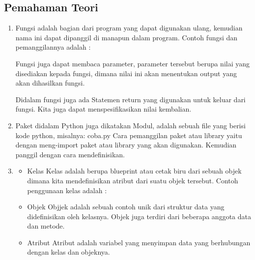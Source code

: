 \subsection{Pemahaman Teori}
\begin{enumerate}
	\item Fungsi adalah bagian dari program yang dapat digunakan ulang, kemudian nama ini dapat dipanggil di manapun dalam program.
	Contoh fungsi dan pemanggilannya adalah :
	
	Fungsi juga dapat membaca parameter, parameter tersebut berupa nilai yang disediakan kepada fungsi, dimana nilai ini akan menentukan output yang akan dihasilkan fungsi. 
	
	Didalam fungsi juga ada Statemen return yang digunakan untuk keluar dari fungsi. Kita juga dapat menspesifikasikan nilai kembalian.
	
	
	\item Paket didalam Python juga dikatakan Modul,  adalah sebuah file yang berisi kode python, misalnya: coba.py 
	Cara pemanggilan paket atau library yaitu dengan meng-import paket atau library yang akan digunakan. Kemudian panggil dengan cara mendefinisikan.
	
	
	\item \begin{itemize}
		\item Kelas
		Kelas adalah berupa blueprint atau cetak biru dari sebuah objek dimana kita mendefinisikan atribut dari suatu objek tersebut.
		Contoh penggunaan kelas adalah : 
		
		
		\item Objek
		Objjek adalah sebuah contoh unik dari struktur data yang didefinisikan oleh kelasnya. Objek juga terdiri dari beberapa anggota data dan metode.
		
		
		\item Atribut
		Atribut adalah variabel yang menyimpan data yang berhubungan dengan kelas dan objeknya.
		
		

\end{itemize}
\end{enumerate}
